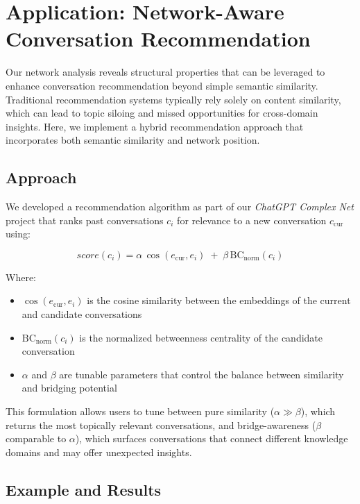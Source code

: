 \documentclass[10pt, a4paper]{article}
\begin{document}
\section{Application: Network-Aware Conversation Recommendation}

Our network analysis reveals structural properties that can be leveraged to enhance conversation recommendation beyond simple semantic similarity. Traditional recommendation systems typically rely solely on content similarity, which can lead to topic siloing and missed opportunities for cross-domain insights. Here, we implement a hybrid recommendation approach that incorporates both semantic similarity and network position.

\subsection{Approach}

We developed a recommendation algorithm as part of our \emph{ChatGPT Complex Net} project \cite{chatgpt-complex-net} that ranks past conversations \(c_i\) for relevance to a new conversation \(c_{\text{cur}}\) using:

\[
  \mathit{score}(c_i)
    = \alpha\,\cos(e_{\text{cur}},e_i)\;
      +\;\beta\,\mathrm{BC}_{\text{norm}}(c_i)
\]

Where:
\begin{itemize}
    \item \(\cos(e_{\text{cur}},e_i)\) is the cosine similarity between the embeddings of the current and candidate conversations
    \item \(\mathrm{BC}_{\text{norm}}(c_i)\) is the normalized betweenness centrality of the candidate conversation
    \item \(\alpha\) and \(\beta\) are tunable parameters that control the balance between similarity and bridging potential
\end{itemize}

This formulation allows users to tune between pure similarity (\(\alpha \gg \beta\)), which returns the most topically relevant conversations, and bridge-awareness (\(\beta\) comparable to \(\alpha\)), which surfaces conversations that connect different knowledge domains and may offer unexpected insights.

\subsection{Example and Results}
\end{document}
